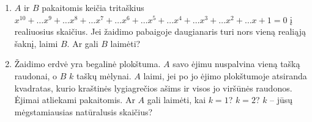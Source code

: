\begin{enumerate}
\item $A$ ir $B$ pakaitomis keičia tritaškius $x^{10}+\dots x^9+\dots x^8+\dots
  x^7+\dots x^6+\dots x^5+\dots x^4+\dots x^3+\dots x^2+\dots x+1=0$ į
  realiuosius skaičius. Jei žaidimo pabaigoje daugianaris turi nors vieną
  realiąją šaknį, laimi $B$. Ar gali $B$ laimėti?


\item \text{[Kvant 1987]} Žaidimo erdvė yra begalinė plokštuma. $A$ savo
  ėjimu nuspalvina vieną tašką raudonai, o $B$ $k$ taškų mėlynai. $A$
  laimi, jei po jo ėjimo plokštumoje atsiranda kvadratas, kurio kraštinės
  lygiagrečios ašims ir visos jo viršūnės raudonos. Ėjimai atliekami
  pakaitomis. Ar $A$ gali laimėti, kai $k=1$? $k=2$? $k$ – jūsų
  mėgstamiausias natūralusis skaičius?


\end{enumerate}
